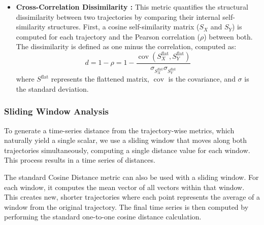 \documentclass[a4paper,12pt]{article}
\begin{document}
\begin{itemize}
    \item \textbf{Cross-Correlation Dissimilarity \cite{pearson} \cite{scipy_pearson}:} This metric quantifies the structural dissimilarity between two trajectories by comparing their internal self-similarity structures. First, a cosine self-similarity matrix ($S_X$ and $S_Y$) is computed for each trajectory and the Pearson correlation ($\rho$) between both. The dissimilarity is defined as one minus the correlation, computed as:
    \begin{equation}
        d = 1 - \rho = 1 - \frac{\operatorname{cov}(S_X^\text{flat}, S_Y^\text{flat})}{\sigma_{S_X^\text{flat}} \sigma_{S_Y^\text{flat}}}
    \end{equation}
    where $S^\text{flat}$ represents the flattened matrix, $\operatorname{cov}$ is the covariance, and $\sigma$ is the standard deviation.

\end{itemize}

\subsubsection{Sliding Window Analysis}
\label{sssec:methods_sliding_window}
To generate a time-series distance from the trajectory-wise metrics, which naturally yield a single scalar, we use a sliding window that moves along both trajectories simultaneously, computing a single distance value for each window. This process results in a time series of distances. 

The standard Cosine Distance metric can also be used with a sliding window. For each window, it computes the mean vector of all vectors within that window. This creates new, shorter trajectories where each point represents the average of a window from the original trajectory. The final time series is then computed by performing the standard one-to-one cosine distance calculation.

\end{document}

